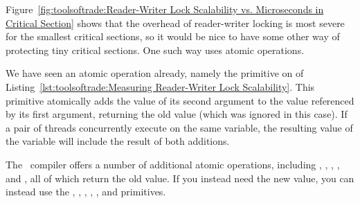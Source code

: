 Figure~\ref{fig:toolsoftrade:Reader-Writer Lock Scalability vs. Microseconds in Critical Section}
shows that the overhead of reader-writer locking is most severe for the
smallest critical sections, so it would be nice to have some other way
of protecting tiny critical sections.
One such way uses atomic operations.
\begin{fcvref}
We have seen an atomic operation already, namely the
 primitive on  of
Listing~\ref{lst:toolsoftrade:Measuring Reader-Writer Lock Scalability}.
This primitive atomically adds the value of its second argument to
the value referenced by its first argument, returning the old value
(which was ignored in this case).
If a pair of threads concurrently execute  on
the same variable, the resulting value of the variable will include
the result of both additions.
\end{fcvref}

The \GNUC\ compiler offers a number of additional atomic operations,
including ,
,
,
, and
, all of which return the old value.
If you instead need the new value, you can instead use the
,
,
,
,
, and
 primitives.

\QuickQuizEnd

